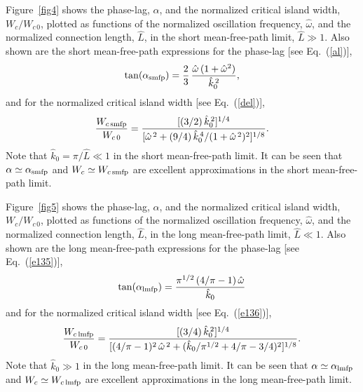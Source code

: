 \documentclass[12pt,prb,aps]{revtex4-1}
\begin{document}
Figure~\ref{fig4} shows the phase-lag, $\alpha$, and the normalized critical island width, $W_c/W_{c\,0}$, plotted as functions of
the normalized oscillation frequency, $\hat{\omega}$, and the normalized connection length, $\hat{L}$, in the short mean-free-path
limit, $\hat{L}\gg 1$. Also shown are the short mean-free-path expressions for the phase-lag [see Eq.~(\ref{al})], 
\begin{equation}
\tan(\alpha_{\rm smfp}) = \frac{2}{3}\,\frac{\hat{\omega}\,(1+\hat{\omega}^2)}{\hat{k}_0^{\,2}},
\end{equation}
and for the normalized critical island width [see Eq.~(\ref{del})], 
\begin{equation}\label{e151}
\frac{W_{c\,{\rm smfp}}}{W_{c\,0}} = \frac{[(3/2)\,\hat{k}_0^{\,2}]^{1/4}}{[\hat{\omega}^{\,2} + (9/4)\,\hat{k}_0^{\,4}/(1+\hat{\omega}^{\,2})^2]^{1/8}}.
\end{equation}
Note that $\hat{k}_0=\pi/\hat{L}\ll 1$ in the short mean-free-path limit. 
It can be seen that $\alpha\simeq \alpha_{\rm smfp}$ and $W_c\simeq W_{c\,{\rm smfp}}$ are excellent approximations in the short mean-free-path limit. 

Figure~\ref{fig5} shows the phase-lag, $\alpha$, and the normalized critical island width, $W_c/W_{c\,0}$, plotted as functions of
the normalized oscillation frequency, $\hat{\omega}$, and the normalized connection length, $\hat{L}$, in the long mean-free-path
limit, $\hat{L}\ll 1$. Also shown are the long mean-free-path expressions for the phase-lag [see Eq.~(\ref{e135})], 
\begin{equation}
\tan(\alpha_{\rm lmfp}) = \frac{\pi^{1/2}\,(4/\pi-1)\,\hat{\omega}}{\hat{k}_0}
\end{equation}
and for the normalized critical island width [see Eq.~(\ref{e136})], 
\begin{equation}\label{e153}
\frac{W_{c\,{\rm lmfp}}}{W_{c\,0}} = \frac{[(3/4)\,\hat{k}_0^{\,2}]^{1/4}}{[(4/\pi-1)^2\,\hat{\omega}^{\,2}+(\hat{k}_0/\pi^{1/2}+4/\pi-3/4)^2]^{1/8}}.
\end{equation}
Note that $\hat{k}_0\gg 1$ in the long mean-free-path limit. 
It can be seen that $\alpha\simeq \alpha_{\rm lmfp}$ and $W_c\simeq W_{c\,{\rm lmfp}}$ are excellent approximations in the long mean-free-path limit. 
\end{document}
